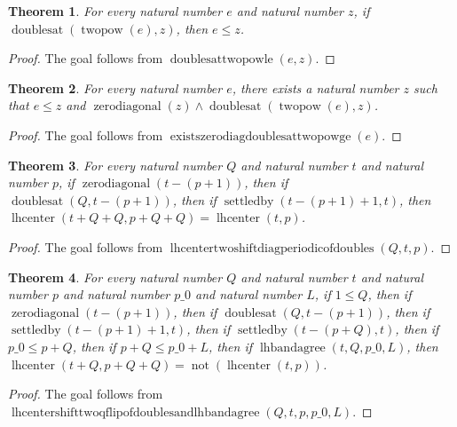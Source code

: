 \documentclass[11pt]{article}
\newtheorem{theorem}{Theorem}[section]
\theoremstyle{definition}
\begin{document}
\begin{theorem}
\label{ll:paper:doublesat-twopow-le}
For every natural number \(e\) and natural number \(z\), if \(\operatorname{doublesat}(\operatorname{twopow}(e), z)\), then \(e \le z\).
\end{theorem}
\begin{proof}
The goal follows from \(\operatorname{doublesattwopowle}(e, z)\).
\end{proof}
\begin{theorem}
\label{ll:paper:exists-zero-diag-doublesat-twopow-ge}
For every natural number \(e\), there exists a natural number \(z\) such that \(e \le z\) and \(\operatorname{zerodiagonal}(z) \land \operatorname{doublesat}(\operatorname{twopow}(e), z)\).
\end{theorem}
\begin{proof}
The goal follows from \(\operatorname{existszerodiagdoublesattwopowge}(e)\).
\end{proof}
\begin{theorem}
\label{ll:paper:lhcenter-two-shift-diag-periodic-of-doubles}
For every natural number \(Q\) and natural number \(t\) and natural number \(p\), if \(\operatorname{zerodiagonal}(t - (p + 1))\), then if \(\operatorname{doublesat}(Q, t - (p + 1))\), then if \(\operatorname{settledby}(t - (p + 1) + 1, t)\), then \(\operatorname{lhcenter}(t + Q + Q, p + Q + Q) = \operatorname{lhcenter}(t, p)\).
\end{theorem}
\begin{proof}
The goal follows from \(\operatorname{lhcentertwoshiftdiagperiodicofdoubles}(Q, t, p)\).
\end{proof}
\begin{theorem}
\label{ll:paper:lhcenter-shift-two-q-flip-of-doubles-and-lhbandagree}
For every natural number \(Q\) and natural number \(t\) and natural number \(p\) and natural number \(p\_0\) and natural number \(L\), if \(1 \le Q\), then if \(\operatorname{zerodiagonal}(t - (p + 1))\), then if \(\operatorname{doublesat}(Q, t - (p + 1))\), then if \(\operatorname{settledby}(t - (p + 1) + 1, t)\), then if \(\operatorname{settledby}(t - (p + Q), t)\), then if \(p\_0 \le p + Q\), then if \(p + Q \le p\_0 + L\), then if \(\operatorname{lhbandagree}(t, Q, p\_0, L)\), then \(\operatorname{lhcenter}(t + Q, p + Q + Q) = \operatorname{not}(\operatorname{lhcenter}(t, p))\).
\end{theorem}
\begin{proof}
The goal follows from \(\operatorname{lhcentershifttwoqflipofdoublesandlhbandagree}(Q, t, p, p\_0, L)\).
\end{proof}
\end{document}
